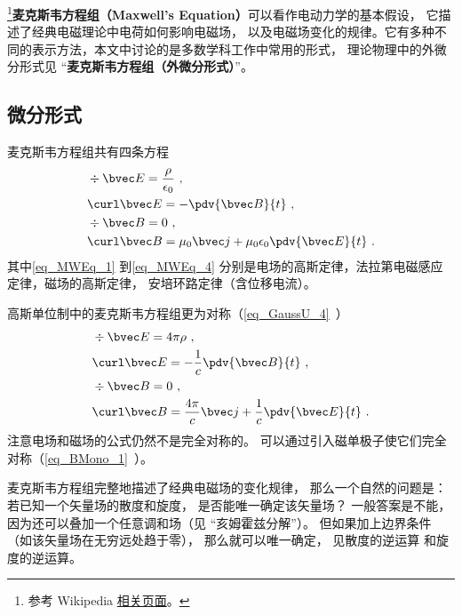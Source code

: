 
\begin{issues}
\end{issues}


\footnote{参考 Wikipedia \href{https://en.wikipedia.org/wiki/Maxwell's_equations}{相关页面}。}\textbf{麦克斯韦方程组（Maxwell's Equation）}可以看作电动力学的基本假设， 它描述了经典电磁理论中电荷如何影响电磁场， 以及电磁场变化的规律。它有多种不同的表示方法，本文中讨论的是多数学科工作中常用的形式， 理论物理中的外微分形式见 “\textbf{麦克斯韦方程组（外微分形式）}”。

\subsection{微分形式}
麦克斯韦方程组共有四条方程
\begin{align}\label{eq_MWEq_1}
&\div \bvec E = \frac{\rho}{\epsilon_0}~,\\
\label{eq_MWEq_2}
&\curl \bvec E = -\pdv{\bvec B}{t}~,\\
\label{eq_MWEq_3}
&\div \bvec B = 0~,\\
\label{eq_MWEq_4}
&\curl \bvec B = \mu_0 \bvec j + \mu_0\epsilon_0 \pdv{\bvec E}{t}~.
\end{align}
其中\autoref{eq_MWEq_1} 到\autoref{eq_MWEq_4} 分别是电场的高斯定律，法拉第电磁感应定律，磁场的高斯定律， 安培环路定律（含位移电流）。

高斯单位制中的麦克斯韦方程组更为对称（\autoref{eq_GaussU_4}~）
\begin{equation}
\begin{aligned}
&\div \bvec E = 4\pi\rho~,\\
&\curl \bvec E = -\frac{1}{c}\pdv{\bvec B}{t}~,\\
&\div \bvec B = 0 ~,\\
&\curl \bvec B = \frac{4\pi}{c} \bvec j + \frac{1}{c}\pdv{\bvec E}{t}~.
\end{aligned}
\end{equation}
注意电场和磁场的公式仍然不是完全对称的。 可以通过引入磁单极子使它们完全对称（\autoref{eq_BMono_1}~）。

麦克斯韦方程组完整地描述了经典电磁场的变化规律， 那么一个自然的问题是： 若已知一个矢量场的散度和旋度， 是否能唯一确定该矢量场？ 一般答案是不能， 因为还可以叠加一个任意调和场（见 “亥姆霍兹分解”）。 但如果加上边界条件（如该矢量场在无穷远处趋于零）， 那么就可以唯一确定， 见散度的逆运算 和旋度的逆运算。

